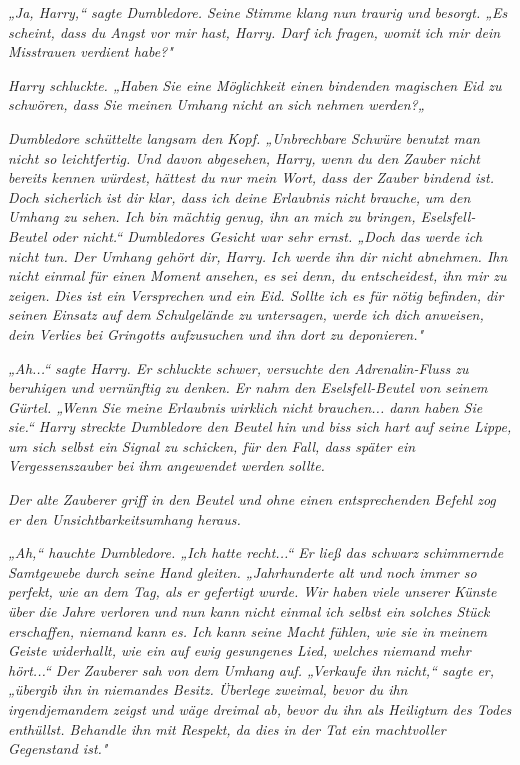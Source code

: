 {\emph{„Ja, Harry,“ sagte Dumbledore. Seine Stimme klang nun traurig und besorgt. „Es scheint, dass du Angst vor mir hast, Harry. Darf ich fragen, womit ich mir dein Misstrauen verdient habe?"}

\emph{Harry schluckte. „Haben Sie eine Möglichkeit einen bindenden magischen Eid zu schwören, dass Sie meinen Umhang nicht an sich nehmen werden?„}

\emph{Dumbledore schüttelte langsam den Kopf. „Unbrechbare Schwüre benutzt man nicht so leichtfertig. Und davon abgesehen, Harry, wenn du den Zauber nicht bereits kennen würdest, hättest du nur mein Wort, dass der Zauber bindend ist. Doch sicherlich ist dir klar, dass ich deine Erlaubnis nicht} \emph{\emph{brauche,}} \emph{um den Umhang zu sehen. Ich bin mächtig genug, ihn an mich zu bringen, Eselsfell-Beutel oder nicht.“ Dumbledores Gesicht war sehr ernst. „Doch das werde ich nicht tun. Der Umhang gehört dir, Harry. Ich werde ihn dir nicht abnehmen. Ihn nicht einmal für einen Moment ansehen, es sei denn, du entscheidest, ihn mir zu zeigen. Dies ist ein Versprechen und ein Eid. Sollte ich es für nötig befinden, dir seinen Einsatz auf dem Schulgelände zu untersagen, werde ich dich anweisen, dein Verlies bei Gringotts aufzusuchen und ihn dort zu deponieren."}

\emph{„Ah...“ sagte Harry. Er schluckte schwer, versuchte den Adrenalin-Fluss zu beruhigen und vernünftig zu denken. Er nahm den Eselsfell-Beutel von seinem Gürtel. „Wenn Sie meine Erlaubnis} \emph{\emph{wirklich}} \emph{nicht brauchen... dann haben Sie sie.“ Harry streckte Dumbledore den Beutel hin und biss sich hart auf seine Lippe, um sich selbst ein Signal zu schicken, für den Fall, dass später ein Vergessenszauber bei ihm angewendet werden sollte.}

\emph{Der alte Zauberer griff in den Beutel und ohne einen entsprechenden Befehl zog er den Unsichtbarkeitsumhang heraus.}

\emph{„Ah,“ hauchte Dumbledore. „Ich hatte recht...“ Er ließ das schwarz} \emph{schimmernde Samtgewebe durch seine Hand gleiten. „Jahrhunderte alt und noch immer so perfekt, wie an dem Tag, als er gefertigt wurde. Wir haben viele unserer Künste über die Jahre verloren und nun kann nicht einmal ich selbst ein solches Stück erschaffen, niemand kann es. Ich kann seine Macht fühlen, wie sie in meinem Geiste widerhallt, wie ein auf ewig gesungenes Lied, welches niemand mehr hört...“ Der Zauberer sah von dem Umhang auf. „Verkaufe ihn nicht,“ sagte er, „übergib ihn in niemandes Besitz. Überlege zweimal, bevor du ihn irgendjemandem zeigst und wäge dreimal ab, bevor du ihn als Heiligtum des Todes enthüllst. Behandle ihn mit Respekt, da dies in der Tat ein machtvoller Gegenstand ist."}

}
